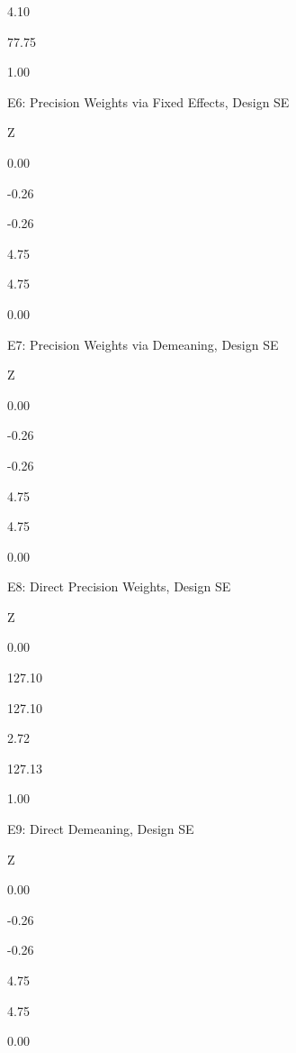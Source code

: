 \documentclass[
  12pt,
]{book}
\newenvironment{Shaded}{\begin{snugshade}}{\end{snugshade}}
\newcommand{\DataTypeTok}[1]{\textcolor[rgb]{0.13,0.29,0.53}{#1}}
\newcommand{\KeywordTok}[1]{\textcolor[rgb]{0.13,0.29,0.53}{\textbf{#1}}}
\newcommand{\NormalTok}[1]{#1}
\newcommand{\OperatorTok}[1]{\textcolor[rgb]{0.81,0.36,0.00}{\textbf{#1}}}
\newcommand{\StringTok}[1]{\textcolor[rgb]{0.31,0.60,0.02}{#1}}
\theoremstyle{definition}
\theoremstyle{definition}
\theoremstyle{definition}
\theoremstyle{remark}
\begin{document}
4.10

77.75

1.00

E6: Precision Weights via Fixed Effects, Design SE

Z

0.00

-0.26

-0.26

4.75

4.75

0.00

E7: Precision Weights via Demeaning, Design SE

Z

0.00

-0.26

-0.26

4.75

4.75

0.00

E8: Direct Precision Weights, Design SE

Z

0.00

127.10

127.10

2.72

127.13

1.00

E9: Direct Demeaning, Design SE

Z

0.00

-0.26

-0.26

4.75

4.75

0.00

\begin{Shaded}
\end{Shaded}
\end{document}

